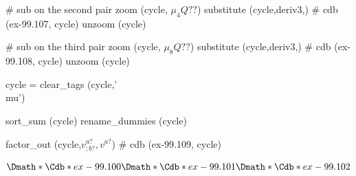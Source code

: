 \documentclass[12pt]{cdblatex}
\begin{document}
\begin{cadabra}
   # sub on the second pair
   zoom (cycle, $\mu_{4} Q??$)
   substitute (cycle,deriv3,)                      # cdb (ex-99.107, cycle)
   unzoom (cycle)

   # sub on the third pair
   zoom (cycle, $\mu_{8} Q??$)
   substitute (cycle,deriv3,)                      # cdb (ex-99.108, cycle)
   unzoom (cycle)

   cycle = clear_tags (cycle,'\\mu')

   sort_sum (cycle)
   rename_dummies (cycle)

   factor_out (cycle,$v^{a?}_{; b?},v^{a?}$)       # cdb (ex-99.109, cycle)

\end{cadabra}

\clearpage

\begin{dgroup*}[spread={3pt}]
   \Dmath*{\Cdb*{ex-99.100}}
   \Dmath*{\Cdb*{ex-99.101}}
   \Dmath*{\Cdb*{ex-99.102}}
\end{dgroup*}






\end{document}
